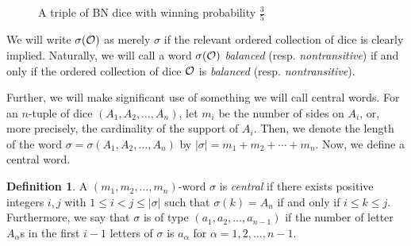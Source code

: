 \documentclass[11pt]{article}
\theoremstyle{definition}
\newtheorem{defn}[theorem]{Definition}
\begin{document}
\begin{figure}[ht]
\centering
{}

\caption{A triple of BN dice with winning probability $\frac{3}{5}$}\label{2ndBalNontranEx}
\end{figure}



We will write $\sigma({\cal O})$ as merely $\sigma$ if the relevant ordered collection of dice is clearly implied. Naturally, we will call a word $\sigma({\cal O})$ \emph{balanced} (resp. \emph{nontransitive}) if and only if the ordered collection of dice ${\cal O}$ is \emph{balanced} (resp. \emph{nontransitive}).

Further, we will make significant use of something we will call central words. For an $n$-tuple of dice $(A_1,A_2,\dots,A_n)$, let $m_i$ be the number of sides on $A_i$, or, more precisely, the cardinality of the support of $A_i$. Then, we denote the length of the word $\sigma = \sigma(A_1,A_2,\dots,A_n)$ by $|\sigma| = m_1+m_2 + \cdots + m_n$. Now, we define a central word.

\begin{defn}
    A $(m_1,m_2,\dots,m_n)$-word $\sigma$ is \emph{central} if there exists positive integers $i,j$ with $1 \leq i < j \leq |\sigma|$ such that $\sigma(k) = A_n$ if and only if $i \leq k \leq j$. Furthermore, we say that $\sigma$ is of type $(a_1,a_2,\dots, a_{n-1})$ if the number of letter $A_\alpha$s in the first $i-1$ letters of $\sigma$ is $a_\alpha$ for $\alpha = 1,2,\dots, n-1$.
\end{defn}
\end{document}
